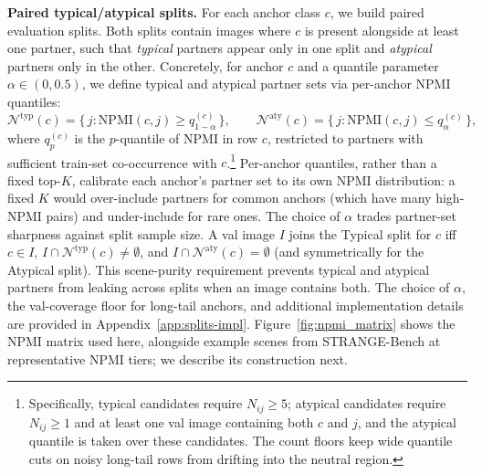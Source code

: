 \noindent\textbf{Paired typical/atypical splits.}
For each anchor class $c$, we build paired evaluation splits. Both splits contain images where $c$ is present alongside at least one partner, such that \textit{typical} partners appear only in one split and \textit{atypical} partners only in the other. Concretely, for anchor $c$ and a quantile parameter $\alpha \in (0, 0.5)$, we define typical and atypical partner sets via per-anchor NPMI quantiles:
\begin{equation}
\mathcal{N}^{\text{typ}}(c) = \{\, j : \text{NPMI}(c, j) \geq q_{1-\alpha}^{(c)} \,\}, \qquad
\mathcal{N}^{\text{aty}}(c) = \{\, j : \text{NPMI}(c, j) \leq q_{\alpha}^{(c)} \,\},
\end{equation}
where $q_{p}^{(c)}$ is the $p$-quantile of NPMI in row $c$, restricted to partners with sufficient train-set co-occurrence with $c$.\footnote{Specifically, typical candidates require $N_{ij} \geq 5$; atypical candidates require $N_{ij} \geq 1$ and at least one val image containing both $c$ and $j$, and the atypical quantile is taken over these candidates. The count floors keep wide quantile cuts on noisy long-tail rows from drifting into the neutral region.} Per-anchor quantiles, rather than a fixed top-$K$, calibrate each anchor's partner set to its own NPMI distribution: a fixed $K$ would over-include partners for common anchors (which have many high-NPMI pairs) and under-include for rare ones. The choice of $\alpha$ trades partner-set sharpness against split sample size. A val image $I$ joins the Typical split for $c$ iff $c \in I$, $I \cap \mathcal{N}^{\text{typ}}(c) \neq \emptyset$, and $I \cap \mathcal{N}^{\text{aty}}(c) = \emptyset$ (and symmetrically for the Atypical split). This scene-purity requirement prevents typical and atypical partners from leaking across splits when an image contains both. The choice of $\alpha$, the val-coverage floor for long-tail anchors, and additional implementation details are provided in Appendix~\ref{app:splits-impl}. Figure~\ref{fig:npmi_matrix} shows the NPMI matrix used here, alongside example scenes from STRANGE-Bench at representative NPMI tiers; we describe its construction next.

